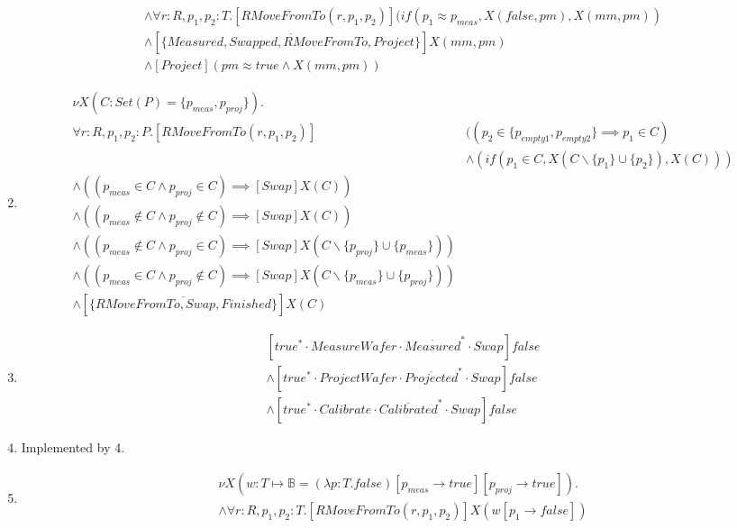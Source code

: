\begin{enumerate}
\begin{align*}
    	&\wedge \forall r:R, p_1, p_2:T.[RMoveFromTo(r, p_1, p_2)](if(p_1 \approx p_\mathit{meas}, X(false, pm), X(mm, pm))\\
    	&\wedge [\overline{\{Measured, Swapped, RMoveFromTo, Project\}}]X(mm, pm)\\
    	&\wedge [Project](pm \approx true \wedge X(mm, pm))
    \end{align*}
        \item \begin{align*}
            &\nu X(C : Set(P) = \{p_\mathit{meas},p_\mathit{proj}\}).\\
            & \forall r:R, p_1, p_2 : P . [RMoveFromTo(r, p_1, p_2)]&((p_2 \in \{p_\mathit{empty1}, p_\mathit{empty2}\} \implies p_1 \in C)\\
            &&\wedge (if(p_1 \in C, X(C\backslash\{p_1\}\cup\{p_2\}), X(C))) \\
            &\wedge ((p_\mathit{meas} \in C \wedge p_\mathit{proj} \in C) \implies [Swap]X(C))\\
            &\wedge ((p_\mathit{meas} \notin C \wedge p_\mathit{proj} \notin C) \implies [Swap]X(C))\\
            &\wedge ((p_\mathit{meas} \notin C \wedge p_\mathit{proj} \in C) \implies [Swap]X(C\backslash\{p_\mathit{proj}\} \cup \{p_\mathit{meas}\}))\\
            &\wedge ((p_\mathit{meas} \in C \wedge p_\mathit{proj} \notin C) \implies [Swap]X(C\backslash\{p_\mathit{meas}\} \cup \{p_\mathit{proj}\}))\\
            &\wedge [\overline{\{RMoveFromTo, Swap, Finished\}}]X(C)
        \end{align*}
    \item \begin{align*}
	    &[true^{*}\cdot MeasureWafer\cdot \overline{Measured}^{*}\cdot Swap]false\\
		&\wedge [true^{*}\cdot ProjectWafer\cdot \overline{Projected}^{*}\cdot Swap]false\\
	    &\wedge [true^{*}\cdot Calibrate\cdot \overline{Calibrated}^{*}\cdot Swap]false
    \end{align*}
    \item Implemented by 4.
    \item \begin{align*}
            &\nu X(w:T\mapsto \mathbb{B} = (\lambda p:T.false)[p_\mathit{meas} \rightarrow true][p_\mathit{proj} \rightarrow true]). \\
            &\wedge \forall r:R, p_1,p_2 :T.[RMoveFromTo(r, p_1,p_2)]X(w[p_1\rightarrow false])\\

\end{align*}
\end{enumerate}
